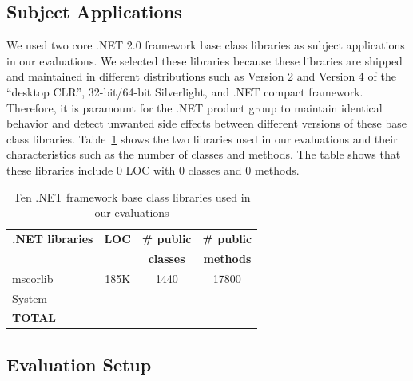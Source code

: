 \subsection{Subject Applications}

We used two core .NET 2.0 framework base class libraries as subject applications 
in our evaluations. We selected these libraries because these libraries are shipped and maintained 
in different distributions such as Version 2 and Version 4 of the ``desktop CLR'', 
32-bit/64-bit Silverlight, and .NET compact framework.
Therefore, it is paramount for the .NET product group to maintain identical behavior 
and detect unwanted side effects between different versions of these base class libraries.
Table~\ref{tab:subjects} shows the two libraries used in our evaluations 
and their characteristics such as the number of classes and methods. 
The table shows that these libraries include $0$ LOC with $0$ classes and $0$ methods.

\setlength{\tabcolsep}{1pt}
\begin{table}[t]
\begin{SmallOut}
\begin{CodeOut}
\begin{center}
\begin {tabular} {|l|c|c|c|}
\hline
\textbf{.NET libraries} & \textbf{LOC} & \textbf{\# public} & \textbf{\# public}\\ 
 & & \textbf{classes} & \textbf{methods}\\ 
\hline
\hline  mscorlib & 185K & 1440 & 17800 \\
\hline  System & & & \\
\hline \textbf{TOTAL} &  &  &   \\
\hline
\end{tabular}
\end{center}
\end{CodeOut}
\end{SmallOut}\vspace*{-4ex}
\centering \caption {\label{tab:subjects}Ten .NET framework base class libraries used in our evaluations}
\end{table}

\subsection{Evaluation Setup}

